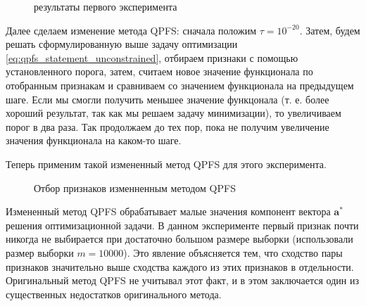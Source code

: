 \documentclass[12pt, twoside]{article}
\newcommand{\ba}{\mathbf{a}}
\begin{document}
\begin{figure}[!htb]
\caption{результаты первого эксперимента}
\label{first_exp}
\end{figure}

Далее сделаем изменение метода QPFS: сначала положим $\tau = 10^{-20}$. Затем, будем решать сформулированную выше задачу оптимизации \ref{eq:qpfs_statement_unconstrained}, отбираем признаки с помощью установленного порога, затем, считаем новое значение функционала по отобранным признакам и сравниваем со значением функционала на предыдущем шаге. Если мы смогли получить меньшее значение функцонала (т. е. более хороший результат, так как мы решаем задачу минимизации), то увеличиваем порог в два раза. Так продолжаем до тех пор, пока не получим увеличение значения функционала на каком-то шаге. 

Теперь применим такой измененный метод QPFS для этого эксперимента.

\begin{figure}[htb]
\caption{Отбор признаков изменненным методом QPFS}
\label{first_exp}
\end{figure}

\newpage
Измененный метод QPFS обрабатывает малые значения компонент вектора $\ba^*$ решения оптимизационной задачи. В данном эксперименте первый признак почти никогда не выбирается при достаточно большом размере выборки (использовали размер выборки $m = 10000$). Это явление объясняется тем, что сходство пары признаков значительно выше сходства каждого из этих признаков в отдельности.
Оригинальный метод QPFS не учитывал этот факт, и в этом заключается один из существенных недостатков оригинального метода.
\end{document}

